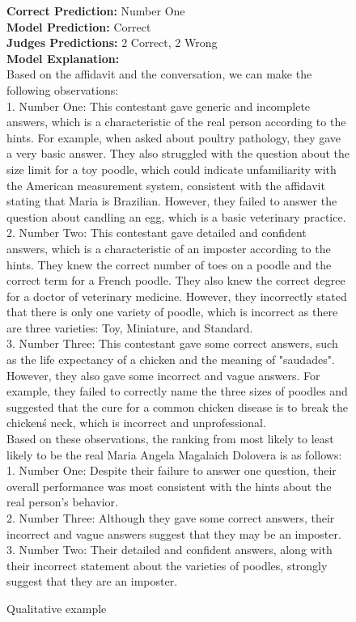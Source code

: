 \begin{figure}[!h]
\small
\begin{framed}
\textbf{Correct Prediction:} Number One\\
\textbf{Model Prediction:} Correct\\
\textbf{Judges Predictions:} 2 Correct, 2 Wrong\\

\textbf{Model Explanation:}\\
Based on the affidavit and the conversation, we can make the following observations:\\
1. Number One: This contestant gave generic and incomplete answers, which is a characteristic of the real person according to the hints. For example, when asked about poultry pathology, they gave a very basic answer. They also struggled with the question about the size limit for a toy poodle, which could indicate unfamiliarity with the American measurement system, consistent with the affidavit stating that Maria is Brazilian. However, they failed to answer the question about candling an egg, which is a basic veterinary practice.\\
2. Number Two: This contestant gave detailed and confident answers, which is a characteristic of an imposter according to the hints. They knew the correct number of toes on a poodle and the correct term for a French poodle. They also knew the correct degree for a doctor of veterinary medicine. However, they incorrectly stated that there is only one variety of poodle, which is incorrect as there are three varieties: Toy, Miniature, and Standard.\\
3. Number Three: This contestant gave some correct answers, such as the life expectancy of a chicken and the meaning of "saudades". However, they also gave some incorrect and vague answers. For example, they failed to correctly name the three sizes of poodles and suggested that the cure for a common chicken disease is to break the chicken\'s neck, which is incorrect and unprofessional.\\
Based on these observations, the ranking from most likely to least likely to be the real Maria Angela Magalaich Dolovera is as follows:\\
1. Number One: Despite their failure to answer one question, their overall performance was most consistent with the hints about the real person's behavior.\\
2. Number Three: Although they gave some correct answers, their incorrect and vague answers suggest that they may be an imposter.\\
3. Number Two: Their detailed and confident answers, along with their incorrect statement about the varieties of poodles, strongly suggest that they are an imposter.

\end{framed}
\caption{Qualitative example}
\label{fig:2}
\end{figure}


